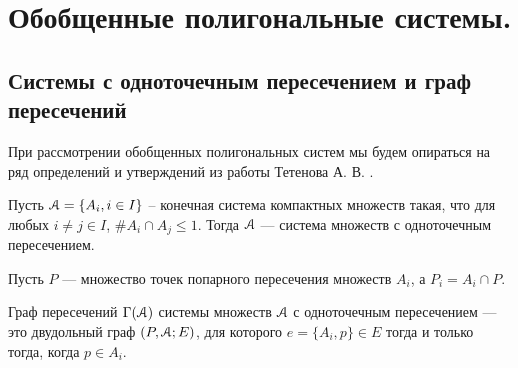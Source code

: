

\section{Обобщенные полигональные системы.} 

\subsection{Системы с одноточечным пересечением и граф пересечений}

При рассмотрении обобщенных полигональных систем мы будем опираться на ряд определений и утверждений из работы Тетенова А. В. \cite{FPS}.

\begin{definition}\label{fipss}
Пусть ${\EuScript A}=\{A_i,i\in I\}$ -- конечная система компактных множеств такая, что для любых $i\neq j\in I$, $\# A_i\cap A_j \le 1$. 
Тогда ${\EuScript A}$ --- система множеств с одноточечным пересечением.
\end{definition}
 
Пусть $P$ --- множество точек попарного пересечения множеств $A_i$, а $P_i=A_i\cap P$.

\begin{definition}\label{igraph}
Граф пересечений  $\Gamma({\EuScript A})$ системы множеств  ${\EuScript A}$ с одноточечным пересечением --- это двудольный граф  $(P,{\EuScript A}; E)$, для которого  $e=\{A_i,p\}\in E$ тогда и только тогда, когда $p\in A_i$. 
\end{definition}

